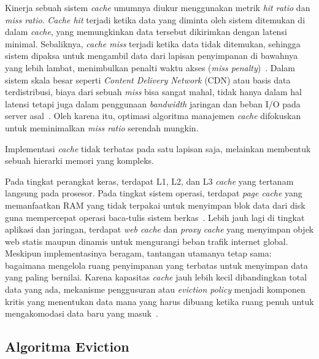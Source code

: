 Kinerja sebuah sistem \textit{cache} umumnya diukur menggunakan metrik
\textit{hit ratio} dan \textit{miss ratio}. \textit{Cache hit} terjadi
ketika data yang diminta oleh sistem ditemukan di dalam \textit{cache},
yang memungkinkan data tersebut dikirimkan dengan latensi minimal.
Sebaliknya, \textit{cache miss} terjadi ketika data tidak ditemukan,
sehingga sistem dipaksa untuk mengambil data dari lapisan penyimpanan
di bawahnya yang lebih lambat, menimbulkan penalti waktu akses
(\textit{miss penalty})~\cite{Jacob2007Memory}. Dalam sistem skala besar
seperti \textit{Content Delivery Network} (CDN) atau basis data terdistribusi,
biaya dari sebuah \textit{miss} bisa sangat mahal, tidak hanya dalam hal
latensi tetapi juga dalam penggunaan \textit{bandwidth} jaringan dan
beban I/O pada server asal~\cite{Vakili2020Cache}. Oleh karena itu,
optimasi algoritma manajemen \textit{cache} difokuskan untuk meminimalkan
\textit{miss ratio} serendah mungkin.

Implementasi \textit{cache} tidak terbatas pada satu lapisan saja,
melainkan membentuk sebuah hierarki memori yang kompleks.

Pada tingkat perangkat keras, terdapat L1, L2, dan L3 \textit{cache}
yang tertanam
langsung pada prosesor. Pada tingkat sistem operasi, terdapat
\textit{page cache} yang memanfaatkan RAM yang tidak terpakai untuk
menyimpan blok data dari disk guna mempercepat operasi baca-tulis
sistem berkas~\cite{Love2010Linux}. Lebih jauh lagi di tingkat aplikasi
dan jaringan, terdapat \textit{web cache} dan \textit{proxy cache}
yang menyimpan objek web statis maupun dinamis untuk mengurangi beban
trafik internet global. Meskipun implementasinya beragam, tantangan
utamanya tetap sama: bagaimana mengelola ruang penyimpanan yang terbatas
untuk menyimpan data yang paling bernilai. Karena kapasitas \textit{cache}
jauh lebih kecil dibandingkan total data yang ada, mekanisme penggusuran
atau \textit{eviction policy} menjadi komponen kritis yang menentukan
data mana yang harus dibuang ketika ruang penuh untuk mengakomodasi
data baru yang masuk~\cite{Podlipnig2003A}.

\subsection{Algoritma Eviction}

